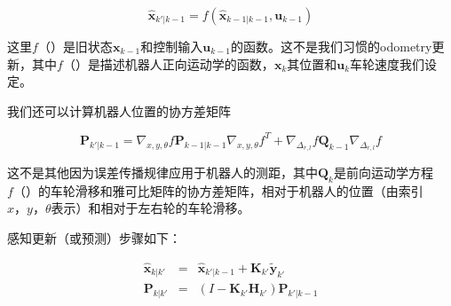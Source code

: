 \begin{equation}
\hat{\boldsymbol{x}}_{k'|k-1} = f(\hat{\boldsymbol{x}}_{k-1|k-1}, \boldsymbol{u}_{k-1})
\end{equation}



这里$f（）$是旧状态$\boldsymbol{x}_{k-1}$和控制输入$\boldsymbol{u}_{k-1}$的函数。这不是我们习惯的odometry更新，其中$f（）$是描述机器人正向运动学的函数，$\boldsymbol{x}_k$其位置和$\boldsymbol{u}_k$车轮速度我们设定。

我们还可以计算机器人位置的协方差矩阵

\begin{equation}
\boldsymbol{P}_{k'|k-1} = \nabla_{x,y,\theta}f \boldsymbol{P}_{k-1|k-1}\nabla_{x,y,\theta}f^T + \nabla_{\Delta_{r,l}}f\boldsymbol{Q}_{k-1}\nabla_{\Delta_{r,l}}f
\end{equation}



这不是其他因为误差传播规律应用于机器人的测距，其中$\boldsymbol{Q}_k$是前向运动学方程$f（）$的车轮滑移和雅可比矩阵的协方差矩阵，相对于机器人的位置（由索引$x，y，\theta$表示）和相对于左右轮的车轮滑移。

感知更新（或预测）步骤如下：

\begin{eqnarray}
\hat{\boldsymbol{x}}_{k|k'} &=& \hat{\boldsymbol{x}}_{k'|k-1} + \boldsymbol{K}_{k'}\tilde{\boldsymbol{y}}_{k'}\\
\boldsymbol{P}_{k|k'} &=& (I - \boldsymbol{K}_{k'} {\boldsymbol{H}_{k'}}) \boldsymbol{P}_{k'|k-1}
\end{eqnarray}


